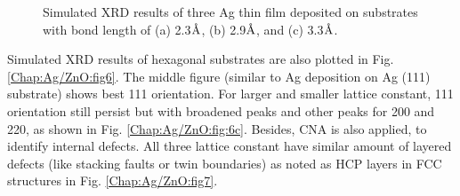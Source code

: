 \begingroup
\begin{figure}[!ht]
  \centering
  \label{Chap:Ag/ZnO:fig:8d}
  \label{Chap:Ag/ZnO:fig:8e}
  \label{Chap:Ag/ZnO:fig:8f}
\caption[Simulated XRD results of Ag thin film morphology on rectangular substrates.]{Simulated \ac{XRD} results of three Ag thin film  deposited on substrates with bond length of (a) 2.3$\mbox{\normalfont\AA}$, (b) 2.9$\mbox{\normalfont\AA}$, and (c) 3.3$\mbox{\normalfont\AA}$.}
  \label{Chap:Ag/ZnO:fig8-2}
\end{figure}
\endgroup


Simulated \ac{XRD} results of hexagonal substrates are also plotted in Fig. \ref{Chap:Ag/ZnO:fig6}. The middle figure (similar to Ag deposition on Ag (111) substrate) shows best {111} orientation. For larger and smaller lattice constant, {111} orientation still persist but with broadened peaks and other peaks for {200} and {220}, as shown in Fig. \ref{Chap:Ag/ZnO:fig:6c}. Besides, \acf{CNA} \cite{kelton1991crystal} is also applied, to identify internal defects. All three lattice constant have similar amount of layered defects (like stacking faults or twin boundaries) as noted as \ac{HCP} layers in \ac{FCC} structures in Fig. \ref{Chap:Ag/ZnO:fig7}.

